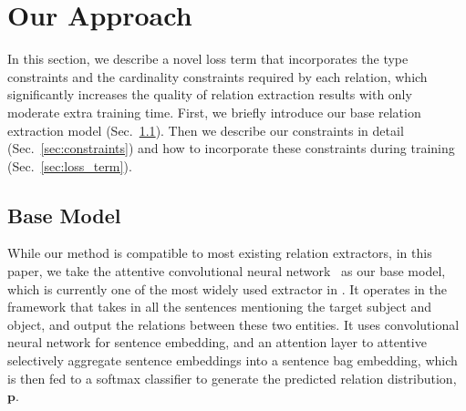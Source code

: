 \section{Our Approach}
In this section, we describe a novel loss term that incorporates the type constraints and the cardinality constraints required by each relation,
which significantly increases the quality of relation extraction results with only moderate extra training time.
First, we briefly introduce our base relation extraction model (Sec.~\ref{sec:base_model}).
Then we describe our constraints in detail (Sec.~\ref{sec:constraints}) and how to incorporate these constraints during training (Sec.~\ref{sec:loss_term}).





\subsection{Base Model}
\label{sec:base_model}
While our method is compatible to most existing relation extractors, in this paper, we take the attentive convolutional neural network~\cite{lin2016neural} as our base model, which is currently one of the most widely used extractor in \RE.
It operates in the \MIL framework that takes in all the sentences mentioning the target subject and object, and output the relations between these two entities.
It uses convolutional neural network for sentence embedding, and an attention layer to attentive selectively aggregate sentence embeddings into a sentence bag embedding, which is then fed to a softmax classifier to generate the predicted relation distribution, $\bm{p}$.





